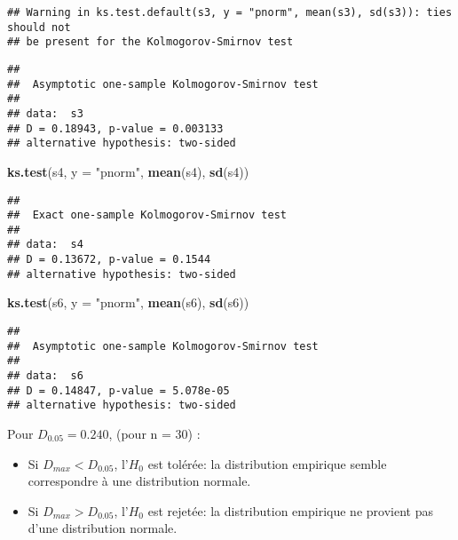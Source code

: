\documentclass[
]{book}
\newenvironment{Shaded}{\begin{snugshade}}{\end{snugshade}}
\newcommand{\AttributeTok}[1]{\textcolor[rgb]{0.13,0.29,0.53}{#1}}
\newcommand{\FunctionTok}[1]{\textcolor[rgb]{0.13,0.29,0.53}{\textbf{#1}}}
\newcommand{\NormalTok}[1]{#1}
\newcommand{\StringTok}[1]{\textcolor[rgb]{0.31,0.60,0.02}{#1}}
\providecommand{\tightlist}{%
  \setlength{\itemsep}{0pt}\setlength{\parskip}{0pt}}
\theoremstyle{definition}
\theoremstyle{definition}
\theoremstyle{definition}
\theoremstyle{definition}
\theoremstyle{remark}
\begin{document}
\begin{verbatim}
## Warning in ks.test.default(s3, y = "pnorm", mean(s3), sd(s3)): ties should not
## be present for the Kolmogorov-Smirnov test
\end{verbatim}

\begin{verbatim}
## 
##  Asymptotic one-sample Kolmogorov-Smirnov test
## 
## data:  s3
## D = 0.18943, p-value = 0.003133
## alternative hypothesis: two-sided
\end{verbatim}

\begin{Shaded}
\begin{Highlighting}[]
\FunctionTok{ks.test}\NormalTok{(s4, }\AttributeTok{y =} \StringTok{"pnorm"}\NormalTok{, }\FunctionTok{mean}\NormalTok{(s4), }\FunctionTok{sd}\NormalTok{(s4))}
\end{Highlighting}
\end{Shaded}

\begin{verbatim}
## 
##  Exact one-sample Kolmogorov-Smirnov test
## 
## data:  s4
## D = 0.13672, p-value = 0.1544
## alternative hypothesis: two-sided
\end{verbatim}

\begin{Shaded}
\begin{Highlighting}[]
\FunctionTok{ks.test}\NormalTok{(s6, }\AttributeTok{y =} \StringTok{"pnorm"}\NormalTok{, }\FunctionTok{mean}\NormalTok{(s6), }\FunctionTok{sd}\NormalTok{(s6))}
\end{Highlighting}
\end{Shaded}

\begin{verbatim}
## 
##  Asymptotic one-sample Kolmogorov-Smirnov test
## 
## data:  s6
## D = 0.14847, p-value = 5.078e-05
## alternative hypothesis: two-sided
\end{verbatim}

Pour \(D_{0.05} = 0.240\), (pour n = 30) :

\begin{itemize}
\tightlist
\item
  Si \(D_{max} < D_{0.05}\), l'\(H_0\) est tolérée: la distribution empirique semble correspondre à une distribution normale.
\item
  Si \(D_{max} > D_{0.05}\), l'\(H_0\) est rejetée: la distribution empirique ne provient pas d'une distribution normale.
\end{itemize}
\end{document}
